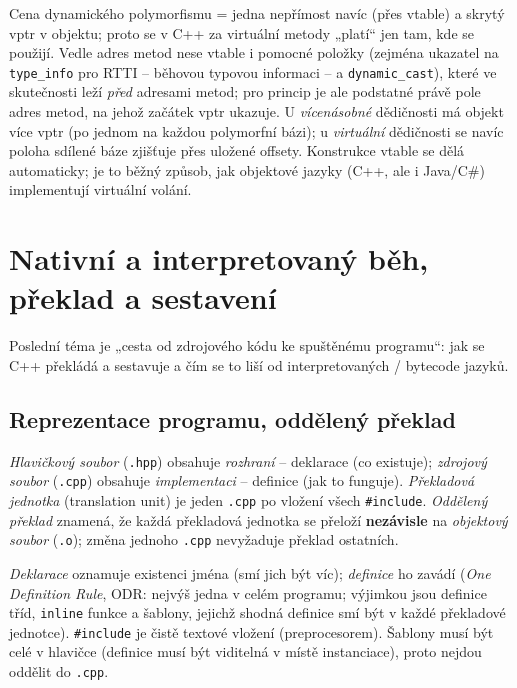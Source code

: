 \documentclass[11pt,a4paper]{article}
\newcommand{\cd}{\lstinline[style=cpp]}
\begin{document}
\begin{poznamka}
Cena dynamického polymorfismu = jedna nepřímost navíc (přes vtable) a skrytý vptr v objektu; proto se v C++ za virtuální metody „platí`` jen tam, kde se použijí. Vedle adres metod nese vtable i pomocné položky (zejména ukazatel na \texttt{type\_info} pro RTTI -- běhovou typovou informaci -- a \cd{dynamic_cast}), které ve skutečnosti leží \emph{před} adresami metod; pro princip je ale podstatné právě pole adres metod, na jehož začátek vptr ukazuje. U \emph{vícenásobné} dědičnosti má objekt více vptr (po jednom na každou polymorfní bázi); u \emph{virtuální} dědičnosti se navíc poloha sdílené báze zjišťuje přes uložené offsety. Konstrukce vtable se dělá automaticky; je to běžný způsob, jak objektové jazyky (C++, ale i Java/C\#) implementují virtuální volání.
\end{poznamka}

\section{Nativní a interpretovaný běh, překlad a sestavení}

Poslední téma je „cesta od zdrojového kódu ke spuštěnému programu``: jak se C++ překládá a sestavuje a čím se to liší od interpretovaných / bytecode jazyků.

\subsection{Reprezentace programu, oddělený překlad}

\begin{definice}
\emph{Hlavičkový soubor} (\texttt{.hpp}) obsahuje \emph{rozhraní} -- deklarace (co existuje); \emph{zdrojový soubor} (\texttt{.cpp}) obsahuje \emph{implementaci} -- definice (jak to funguje). \emph{Překladová jednotka} (translation unit) je jeden \texttt{.cpp} po vložení všech \cd{#include}. \emph{Oddělený překlad} znamená, že každá překladová jednotka se přeloží \textbf{nezávisle} na \emph{objektový soubor} (\texttt{.o}); změna jednoho \texttt{.cpp} nevyžaduje překlad ostatních.
\end{definice}

\begin{poznamka}
\emph{Deklarace} oznamuje existenci jména (smí jich být víc); \emph{definice} ho zavádí (\emph{One Definition Rule}, ODR: nejvýš jedna v celém programu; výjimkou jsou definice tříd, \cd{inline} funkce a šablony, jejichž shodná definice smí být v každé překladové jednotce). \cd{#include} je čistě textové vložení (preprocesorem). Šablony musí být celé v hlavičce (definice musí být viditelná v místě instanciace), proto nejdou oddělit do \texttt{.cpp}.
\end{poznamka}
\end{document}

